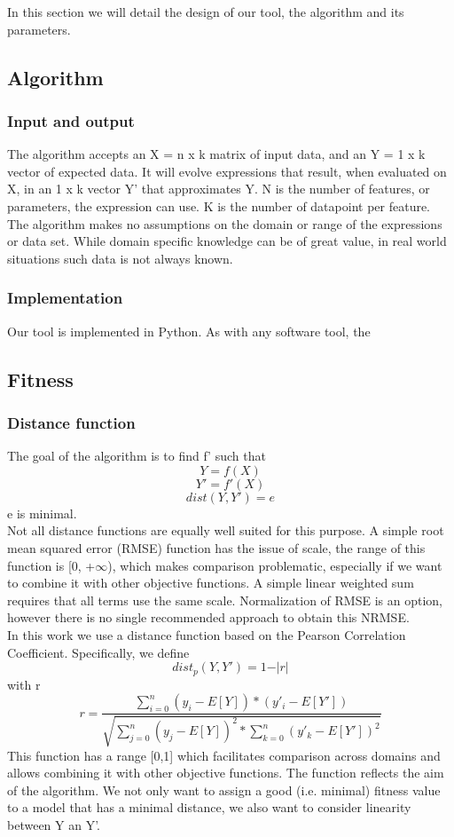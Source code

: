 In this section we will detail the design of our tool, the algorithm and its parameters. 
\subsection{Algorithm}
\subsubsection{Input and output}
The algorithm accepts an X = n x k matrix of input data, and an Y = 1 x k  vector of expected data. It will evolve expressions that result, when evaluated on X, in an 1 x k vector Y' that approximates Y. N is the number of features, or parameters, the expression can use. K is the number of datapoint per feature. The algorithm makes no assumptions on the domain or range of the expressions or data set. While domain specific knowledge can be of great value, in real world situations such data is not always known.

\subsubsection{Implementation}
Our tool is implemented in Python. As with any software tool, the 

\subsection{Fitness}

\subsubsection{Distance function}
The goal of the algorithm is to find f' such that
\[Y = f(X)\]
\[Y' = f'(X)\]
\[dist(Y, Y') = e\]
e is minimal.\\
Not all distance functions are equally well suited for this purpose. A simple root mean squared error (RMSE) function has the issue of scale, the range of this function is [0, +$\infty$), which makes comparison problematic, especially if we want to combine it with other objective functions. A simple linear weighted sum requires that all terms use the same scale. 
Normalization of RMSE is an option, however there is no single recommended approach to obtain this NRMSE. \\
In this work we use a distance function based on the Pearson Correlation Coefficient. Specifically, we define 
\[
dist_p(Y, Y') = 1 - \vert r \vert
\]
with r
\[
r = \frac{\sum_{i=0}^{n}{(y_i-E[Y])*(y'_i-E[Y'])}}{\sqrt{\sum_{j=0}^{n}{(y_j-E[Y])^2}*\sum_{k=0}^{n}{(y'_k-E[Y'])^2}}}
\]
This function has a range [0,1] which facilitates comparison across domains and allows combining it with other objective functions.
The function reflects the aim of the algorithm. We not only want to assign a good (i.e. minimal) fitness value to a model that has a minimal distance, we also want to consider linearity between Y an Y'. 

